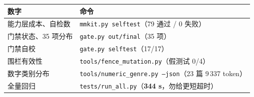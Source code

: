 \documentclass[11pt,a4paper]{article}
\newcommand{\code}[1]{\texttt{#1}}
\begin{document}
\begin{center}\footnotesize
\begin{tabular}{ll}
\toprule
数字 & 命令\\
\midrule
能力层成本、自检数 & \code{mmkit.py selftest}（79 通过 / 0 失败）\\
门禁状态、35 项分布 & \code{gate.py out/final}（35 项）\\
门禁自校 & \code{gate.py selftest}（17/17）\\
围栏有效性 & \code{tools/fence\_mutation.py}（假测试 0/4）\\
数字类别分布 & \code{tools/numeric\_genre.py --json}（23 篇 9\,337 token）\\
全量回归 & \code{tests/run\_all.py}（\textbf{344 s}，勿给更短超时）\\
\bottomrule
\end{tabular}
\end{center}
\end{document}
